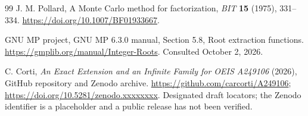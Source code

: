 \documentclass[11pt,a4paper]{article}
\theoremstyle{remark}
\begin{document}
\begin{thebibliography}{99}
J. M. Pollard, A Monte Carlo method for factorization,
\emph{BIT} \textbf{15} (1975), 331--334.
\url{https://doi.org/10.1007/BF01933667}.

GNU MP project, GNU MP 6.3.0 manual, Section 5.8, Root extraction functions.
\url{https://gmplib.org/manual/Integer-Roots}. Consulted October 2, 2026.

C. Corti, \emph{An Exact Extension and an Infinite Family for OEIS A249106}
(2026), GitHub repository and Zenodo archive.
\url{https://github.com/carcorti/A249106};
\url{https://doi.org/10.5281/zenodo.xxxxxxxx}.
Designated draft locators; the Zenodo identifier is a placeholder and a public
release has not been verified.
\end{thebibliography}
\end{document}
